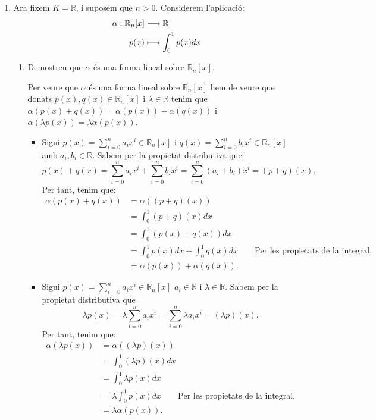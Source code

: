 \documentclass[11pt,a4paper]{article}
\begin{document}
\begin{enumerate}
\begin{enumerate}
        \item Ara fixem $K=\mathbb{R}$, i suposem que $n>0$. Considerem l'aplicació: 
        \begin{align*}
            \centering
            \alpha:\mathbb{R}_n[x]&\longrightarrow \mathbb{R}\\
            p(x)&\longmapsto \int_0^1p(x)dx
        \end{align*}
        \begin{enumerate}
            \item Demostreu que $\alpha$ és una forma lineal sobre $\mathbb{R}_n[x]$.\par
            Per veure que $\alpha$ és una forma lineal sobre $\mathbb{R}_n[x]$ hem de veure que donats $p(x),q(x)\in \mathbb{R}_n[x]$ i $\lambda\in\mathbb{R}$ tenim que $\alpha(p(x)+q(x))=\alpha(p(x))+\alpha(q(x))$ i $\alpha(\lambda p(x))=\lambda\alpha(p(x))$.
            \begin{itemize}
                \item Sigui $p(x)=\sum_{i=0}^na_ix^i\in \mathbb{R}_n[x]$ i $q(x)=\sum_{i=0}^nb_ix^i\in \mathbb{R}_n[x]$ amb $a_i,b_i\in \mathbb{R}$. Sabem per la propietat distributiva que: $$p(x)+q(x)=\sum_{i=0}^na_ix^i+\sum_{i=0}^nb_ix^i=\sum_{i=0}^n(a_i+b_i)x^i=(p+q)(x).$$ Per tant, tenim que:
                \begin{align*}
                    \alpha(p(x)+q(x))&=\alpha((p+q)(x))\\
                    &=\int_0^1(p+q)(x)dx\\
                    &=\int_0^1(p(x)+q(x))dx\\
                    &=\int_0^1 p(x)dx+\int_0^1q(x)dx\qquad\text{Per les propietats de la integral.}\\
                    &=\alpha(p(x))+\alpha(q(x)).
                \end{align*}
                \item Sigui $p(x)=\sum_{i=0}^na_ix^i\in \mathbb{R}_n[x]$ $a_i\in \mathbb{R}$ i $\lambda\in\mathbb{R}$. Sabem per la propietat distributiva que $$\lambda p(x)=\lambda\sum_{i=0}^na_ix^i=\sum_{i=0}^n\lambda a_ix^i=(\lambda p)(x).$$ Per tant, tenim que:
                \begin{align*}
                    \alpha(\lambda p(x))&=\alpha((\lambda p)(x))\\
                    &=\int_0^1(\lambda p)(x)dx\\
                    &=\int_0^1\lambda p(x)dx\\
                    &=\lambda\int_0^1 p(x)dx\qquad\text{Per les propietats de la integral.}\\
                    &=\lambda\alpha(p(x)).
                \end{align*}
            \end{itemize}
            

\end{enumerate}
\end{enumerate}
\end{enumerate}
\end{document}
